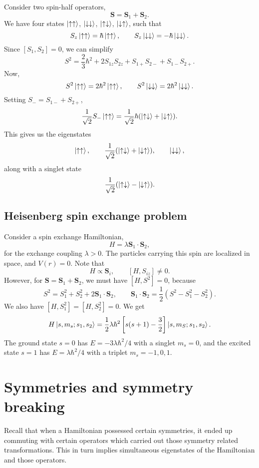 \documentclass[11pt]{article}
\newcommand\ve[1]{\boldsymbol{#1}}
\def\vS{\ve{S}}
\theoremstyle{definition}
\theoremstyle{remark}
\numberwithin{equation}{section}
\begin{document}
    Consider two spin-half operators, \[
        \vS = \vS_1 + \vS_2.
    \] We have four states $\ket{\uparrow\uparrow}$, $\ket{\downarrow\downarrow}$,
    $\ket{\uparrow\downarrow}$, $\ket{\downarrow\uparrow}$, such that \[
        S_z\ket{\uparrow\uparrow} = \hbar \ket{\uparrow\uparrow}, \qquad
        S_z\ket{\downarrow\downarrow} = -\hbar\ket{\downarrow\downarrow}.
    \] Since $[S_1, S_2] = 0$, we can simplify \[
        S^2 = \frac{2}{3}\hbar^2 + 2S_{1z}S_{2z} + S_{1+}S_{2-} + S_{1-}S_{2+}.
    \] Now, \[
        S^2\ket{\uparrow\uparrow} = 2\hbar^2\ket{\uparrow\uparrow}, \qquad
        S^2\ket{\downarrow\downarrow} = 2\hbar^2\ket{\downarrow\downarrow}.
    \] Setting $S_- = S_{1-} + S_{2+}$, \[
        \frac{1}{\sqrt{2}}S_-\ket{\uparrow\uparrow} =
        \frac{1}{\sqrt{2}}\hbar(\ket{\uparrow\downarrow} + \ket{\downarrow\uparrow}).
    \] This gives us the eigenstates \[
        \ket{\uparrow\uparrow}, \qquad \frac{1}{\sqrt{2}}(\ket{\uparrow\downarrow} +
        \ket{\downarrow\uparrow}), \qquad \ket{\downarrow\downarrow},
    \] along with a singlet state \[
        \frac{1}{\sqrt{2}}(\ket{\uparrow\downarrow} - \ket{\downarrow\uparrow}).
    \] 

    \subsection{Heisenberg spin exchange problem}
    Consider a spin exchange Hamiltonian, \[
        H = \lambda\vS_1\cdot\vS_2,
    \] for the exchange coupling $\lambda > 0$. The particles carrying this spin are
    localized in space, and $V(r) = 0$. Note that \[
        H \propto \vS_i, \qquad [H, S_{iz}] \neq 0.
    \] However, for $\vS = \vS_1 + \vS_2$, we must have $[H, S^2] = 0$, because \[
        S^2 = S_1^2 + S_2^2 + 2\vS_1\cdot\vS_2, \qquad \vS_1\cdot\vS_2 =
        \frac{1}{2}(S^2 - S_1^2 - S_2^2).
    \] We also have $[H, S_1^2] = [H, S_2^2] = 0$. We get \[
        H\ket{s, m_s; s_1, s_2} = \frac{1}{2}\lambda\hbar^2\left[s(s + 1) -
        \frac{3}{2}\right]\ket{s, m_S; s_1, s_2}.
    \] The ground state $s = 0$ has $E = -3\lambda \hbar^2 / 4$ with a singlet $m_s
    = 0$, and the excited state $s = 1$ has $E = \lambda\hbar^2 / 4$ with a triplet
    $m_s = -1, 0, 1$.


    \section{Symmetries and symmetry breaking}
    Recall that when a Hamiltonian possessed certain symmetries, it ended up
    commuting with certain operators which carried out those symmetry related
    transformations. This in turn implies simultaneous eigenstates of the
    Hamiltonian and those operators.
    
    
\end{document}
